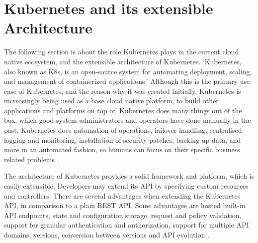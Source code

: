 \section{Kubernetes and its extensible Architecture}
\label{theoretical-background:kubernetes}

The following section is about
the role Kubernetes plays in the current cloud native ecosystem,
and the extensible architecture of Kubernetes.
\enquote*{Kubernetes, also known as K8s, is an open-source system for automating deployment, scaling, and management of containerized applications.}
\autocite{kubernetesIoWebsite}
Although this is the primary use case of Kubernetes,
and the reason why it was created initially,
Kubernetes is increasingly being used as a base cloud native platform,
to build other applications and platforms on top of.
Kubernetes does many things out of the box,
which good system administrators and operators
have done manually in the past.
Kubernetes does automation of operations, failover handling, centralised logging and monitoring,
installation of security patches, backing up data, and more
in an automated fashion,
so humans can focus on their specific business related problems
\autocite{cloudNativeDevopsMitKubernetesArundel2019cloud}.

The architecture of Kubernetes provides a solid framework and platform,
which is easily extensible.
Developers may extend its API by specifying custom resources and controllers.
There are several advantages when extending the Kubernetes API,
in comparison to a plain REST API.
Some advantages are hosted built-in API endpoints, state and configuration storage,
request and policy validation,
support for granular authentication and authorization,
support for multiple API domains, versions, conversion between versions and API evolution
\autocite{kubebuilderBookWebsite}.
%


